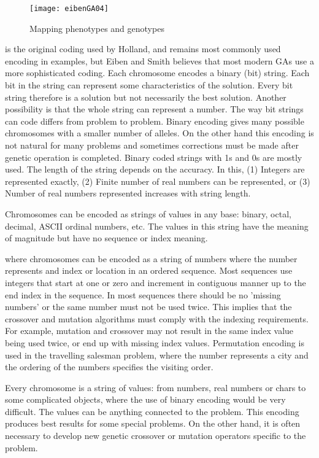 \begin{figure*}[tph]
\texttt{[image: eibenGA04]}
\caption{Mapping phenotypes and genotypes}
\label{fig:eibenGA04}
\end{figure*}





 is the original coding used by Holland, and remains most commonly used encoding in examples, but Eiben and Smith believes that most modern GAs use a more sophisticated coding. 
Each chromosome encodes a binary (bit) string. Each bit in the string can represent some characteristics of the solution. Every bit string therefore is a solution but not necessarily the best solution. Another possibility is that the whole string can represent a number. The way bit strings can code differs from problem to problem. Binary encoding gives many possible chromosomes with a smaller number of alleles. On the other hand this encoding is not natural for many problems and sometimes
corrections must be made after genetic operation is completed. Binary coded strings with 1s and 0s are mostly used. The length of the string depends on the accuracy.
In this, (1) Integers are represented exactly, (2)  Finite number of real numbers can be represented, or (3)  Number of real numbers represented increases with string length\cite{Sivanandam2007}.

Chromosomes can be encoded as strings of values in any base: binary, octal, decimal, ASCII ordinal numbers, etc.  The values in this string have the meaning of magnitude but have no sequence or index meaning.

 where chromosomes can be encoded as a string of numbers 
where the number represents and index or location in an ordered sequence.  Most sequences use integers that start at one or zero and increment in contiguous manner up to the end index in the sequence. In most sequences there should be no 'missing numbers' or the same number must not be used twice.
This implies that the crossover and mutation algorithms must comply with the indexing requirements.
For example, mutation and crossover may not result in the same index value being used twice, or end up with missing index values.
Permutation encoding is used in the travelling salesman problem, where the number represents a city and the ordering of the numbers specifies the visiting order.

Every chromosome is a string of values: from numbers, real numbers or chars to some complicated objects, where the use of binary encoding would be very difficult.  The values can be anything connected to the problem. This encoding produces best results for some special problems. On the other hand, it is often necessary to develop new genetic crossover or mutation operators specific to the problem. 

